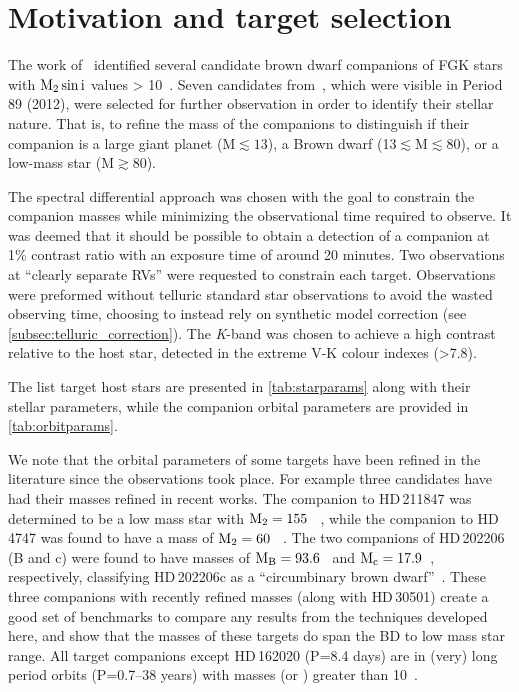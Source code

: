 \section{Motivation and target selection}
\label{sec:target_motivation}
The work of~\citet{sahlmann_search_2011} identified several candidate brown dwarf companions of FGK stars with \(\rm M_2 \sin{i}\) values > 10~\Mjup{}.
Seven candidates from~\citet{sahlmann_search_2011}, which were visible in Period 89 (2012), were selected for further observation in order to identify their stellar nature.
That is, to refine the mass of the companions to distinguish if their companion is a large giant planet (M$\apprle13$\Mjup), a Brown dwarf (13$\apprle $M$\apprle80$\Mjup), or a low-mass star (M$\apprge80$\Mjup).

The spectral differential approach was chosen with the goal to constrain the companion masses while minimizing the observational time required to observe.
It was deemed that it should be possible to obtain a detection of a companion at 1\% contrast ratio with an exposure time of around 20 minutes.
Two observations at ``clearly separate RVs'' were requested to constrain each target.
Observations were preformed without telluric standard star observations to avoid the wasted observing time, choosing to instead rely on synthetic model correction (see \cref{subsec:telluric_correction}).
The \textit{K}-band was chosen to achieve a high contrast relative to the host star, detected in the extreme V-K colour indexes (>7.8).

The list target host stars are presented in \cref{tab:starparams} along with their stellar parameters, while the companion orbital parameters are provided in \cref{tab:orbitparams}.

We note that the orbital parameters of some targets have been refined in the literature since the observations took place.
For example three candidates have had their masses refined in recent works.
The companion to {HD\,211847} was determined to be a low mass star with \(\rm M_2=155~\)\Mjup{}~\citep{moutou_eccentricity_2017}, while the companion to {HD\,4747} was found to have a mass of \(\rm M_2=60~\)\Mjup{}~\citep{crepp_trends_2016}.
The two companions of {HD\,202206} (B and c) were found to have masses of \(\rm M_B =93.6\)~\Mjup{} and \(\rm M_c = 17.9\)~\Mjup{}, respectively, classifying {HD\,202206}c as a ``circumbinary brown dwarf''~\citep{benedict_hd_2017}.
These three companions with recently refined masses (along with {HD\,30501}) create a good set of benchmarks to compare any results from the techniques developed here, and show that the masses of these targets do span the BD to low mass star range.
All target companions except {HD\,162020} (P=8.4 days) are in (very) long period orbits (P=0.7--38 years) with masses (or \Mtwosini{}) greater than 10~\Mjup{}.


